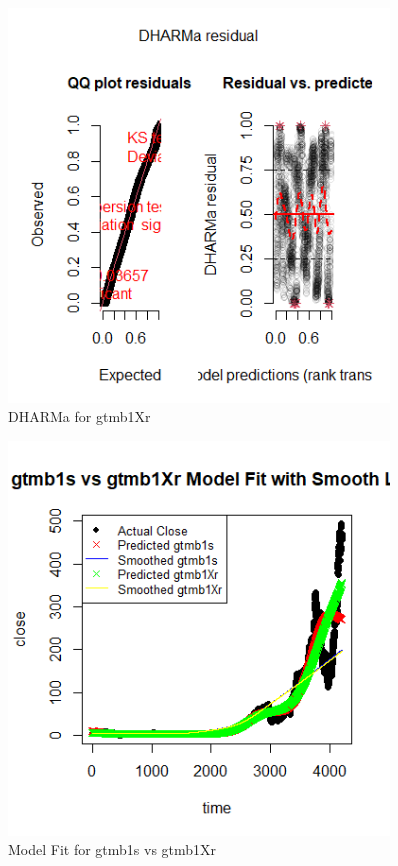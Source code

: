 \begin{figure}[h]
    \centering
    \includegraphics[width=0.9\textwidth]{visuals/DHARMagtmb1Xr.png}
    \caption{DHARMa for gtmb1Xr}
    \label{fig:modfitgtmb7}
\end{figure}


\begin{figure}[h]
    \centering
    \includegraphics[width=0.9\textwidth]{visuals/ModelFitgtmb1s.png}
    \caption{Model Fit for gtmb1s vs gtmb1Xr}
    \label{fig:modfitgtmb7}
\end{figure}


